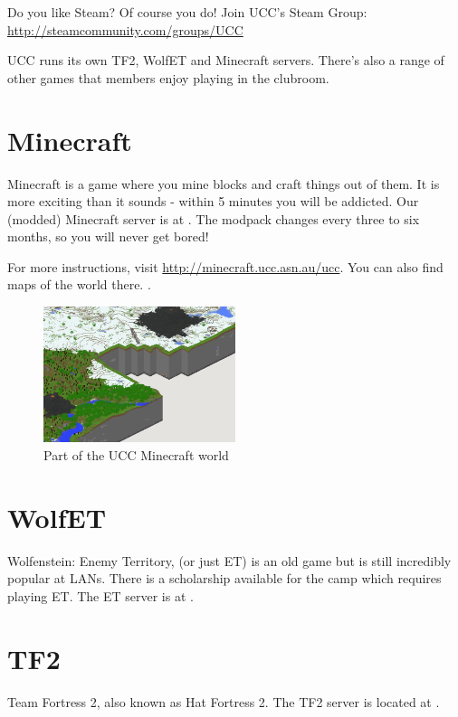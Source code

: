 \label{Games}

Do you like Steam? Of course you do! Join UCC's Steam Group: \url{http://steamcommunity.com/groups/UCC}

\noindent UCC runs its own TF2, WolfET and Minecraft servers.
There's also a range of other games that members enjoy playing in the clubroom.

\section{Minecraft}
Minecraft is a game where you mine blocks and craft things out of them. It is more exciting than it sounds - within 5 minutes you will be addicted.
Our (modded) Minecraft server is at . The modpack changes every three to six months, so you will never get bored!

For more instructions, visit \url{http://minecraft.ucc.asn.au/ucc}. You can also find maps of the world there. .
\begin{figure}[H]
	\centering
	\includegraphics[width=0.5\textwidth]{figures/minecraft_pigmap.png}
	\caption{Part of the UCC Minecraft world}
	\label{minecraft_pigmap.png}
\end{figure}

\section{WolfET}
Wolfenstein: Enemy Territory, (or just ET) is an old game but is still incredibly popular at LANs. There is a scholarship  available for the camp which requires playing ET. The ET server is at .
\pagebreak
\section{TF2}
Team Fortress 2, also known as Hat Fortress 2. The TF2 server is located at .

